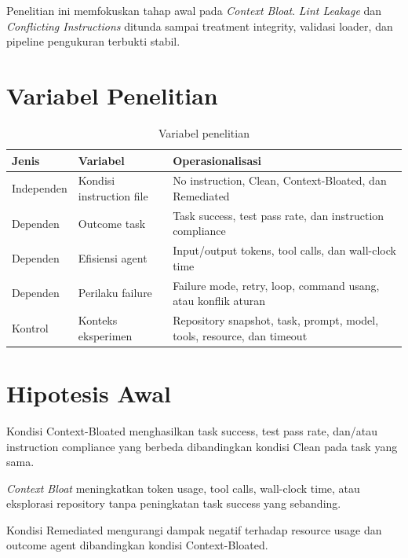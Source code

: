 Penelitian ini memfokuskan tahap awal pada \textit{Context Bloat}. \textit{Lint Leakage} dan \textit{Conflicting Instructions} ditunda sampai treatment integrity, validasi loader, dan pipeline pengukuran terbukti stabil.

\section{Variabel Penelitian}

\begin{table}[htbp]
\centering
\small
\caption{Variabel penelitian}
\label{tab:variables}
\begin{tabularx}{\textwidth}{p{3.1cm}YY}
\toprule
\textbf{Jenis} & \textbf{Variabel} & \textbf{Operasionalisasi} \\
\midrule
Independen & Kondisi instruction file & No instruction, Clean, Context-Bloated, dan Remediated \\
Dependen & Outcome task & Task success, test pass rate, dan instruction compliance \\
Dependen & Efisiensi agent & Input/output tokens, tool calls, dan wall-clock time \\
Dependen & Perilaku failure & Failure mode, retry, loop, command usang, atau konflik aturan \\
Kontrol & Konteks eksperimen & Repository snapshot, task, prompt, model, tools, resource, dan timeout \\
\bottomrule
\end{tabularx}
\end{table}

\section{Hipotesis Awal}

\begin{description}[leftmargin=!,labelwidth=3.5cm]
    \item[H1] Kondisi Context-Bloated menghasilkan task success, test pass rate, dan/atau instruction compliance yang berbeda dibandingkan kondisi Clean pada task yang sama.
    \item[H2] \textit{Context Bloat} meningkatkan token usage, tool calls, wall-clock time, atau eksplorasi repository tanpa peningkatan task success yang sebanding.
    \item[H3] Kondisi Remediated mengurangi dampak negatif terhadap resource usage dan outcome agent dibandingkan kondisi Context-Bloated.
\end{description}

